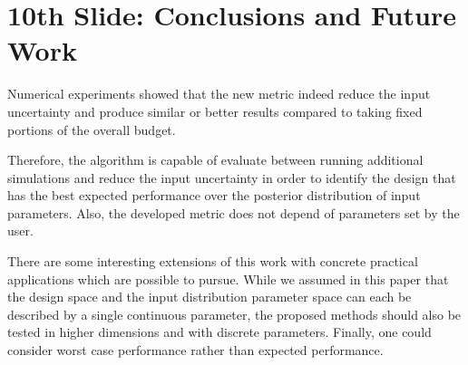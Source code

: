 \documentclass[10pt]{article}
\begin{document}
\section{10th Slide: Conclusions and Future Work}

 Numerical experiments showed that the new metric indeed reduce the input uncertainty and produce similar or better results compared to taking fixed portions of the overall budget. 
 
 Therefore, the algorithm is capable of evaluate between running additional simulations and reduce the input uncertainty in order to identify the design that has the best expected performance over the posterior distribution of input parameters. Also, the developed metric does not depend of parameters set by the user.
 
 There are some interesting extensions of this work with concrete practical applications which are possible to pursue. While we assumed in this paper that the design space and
 the input distribution parameter space can each be described by a single continuous parameter, the proposed methods should also be tested in higher dimensions and with discrete parameters. Finally, one could consider worst case performance rather than expected performance.
	
\end{document}
